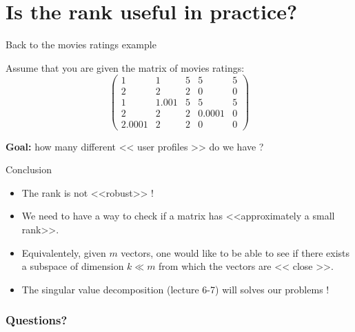 \documentclass{beamer}
\begin{document}
\section{Is the rank useful in practice?}

\begin{frame}[t]{Back to the movies ratings example}
	\grid

	\vspace{-0.3cm}
	Assume that you are given the matrix of movies ratings:
	$$
	\begin{pmatrix}
		1 & 1 & 5 & 5 & 5 \\
		2 & 2 & 2 & 0 & 0 \\
		1 & 1.001 & 5 & 5 & 5 \\
		2 & 2 & 2 & 0.0001 & 0 \\
		2.0001 & 2 & 2 & 0 & 0 
	\end{pmatrix}
	$$

	\vspace{0.5cm}
	\textbf{Goal:} how many different << user profiles >> do we have ?
\end{frame}



\begin{frame}[t]{Conclusion}
	\grid

			\vspace{0.5cm}
	\begin{itemize}
		\item The rank is not <<robust>> !
			\vspace{0.5cm}
		\item We need to have a way to check if a matrix has <<approximately a small rank>>.
			\vspace{0.5cm}
		\item Equivalentely, given $m$ vectors, one would like to be able to see if there exists a subspace of dimension $k \ll m$ from which the vectors are << close >>.
			\vspace{0.5cm}
		\item The singular value decomposition (lecture 6-7) will solves our problems !
	\end{itemize}
\end{frame}


\appendix
\backupbegin
\begin{frame}[t]
	\frametitle{Questions?}
	\grid

	\pause
	\pause
\end{frame}
\backupend
\end{document}
